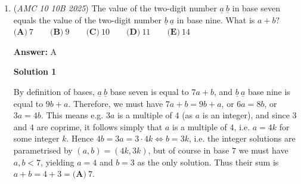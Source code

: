 \begin{enumerate}
 First:

 \( 2^9 = 512 \).

 But we do:

 \( 2^1 \equiv 2 \pmod{10},  2^2 \equiv 4,  2^3 \equiv 8,  2^4 \equiv 6,  2^5 \equiv 2, \), giving a cycle of length $4$.

 Since \( 9 \equiv 1 \pmod{4} \),

 \( 2^9 \equiv 2^1 \equiv 2 \pmod{10} \).

 This tells us nothing, but we keep it.

 Now compute the sums:

 
 \[\sum_{k=1}^{9} \binom{9}{k} = 2^9 - 1 = 511, \text{ and hence also } \sum_{k=1}^{9} \binom{9}{k-1} = 511.\]

 Substitute everything:

 
 \[P_{11}(1) = 10 + 10 \cdot 511 + 511 + 1.\]

 Compute in pieces:

 \( 10 \cdot 511 = 5110 \).

 Then

 \( 10 + 5110 = 5120, 5120 + 511 = 5631, 5631 + 1 = 5632 \).

 So the sum of the entries in the $11$th row is:

 
 \[5632.\]

 We need the sum of its digits:

 \( 5 + 6 + 3 + 2 = 16 \).

 Answer:

 
 \[\boxed{\textbf{(D) } 16}.\]



	\item (\textit{AMC 10 10B 2025}) The value of the two-digit number $\underline{a}~\underline{b}$ in base seven equals the value of the two-digit number $\underline{b}~\underline{a}$ in base nine. What is $a+b?$
$\textbf{(A)}~7\qquad\textbf{(B)}~9\qquad\textbf{(C)}~10\qquad\textbf{(D)}~11\qquad\textbf{(E)}~14$

 \textbf{Answer: }A



\textbf{Solution 1}

By definition of bases, $\underline{a}~\underline{b}$ base seven is equal to $7a+b$, and $\underline{b}~\underline{a}$ base nine is equal to $9b+a$. Therefore, we must have $7a+b=9b+a$, or $6a=8b$, or $3a=4b$. This means e.g. $3a$ is a multiple of $4$ (as $a$ is an integer), and since $3$ and $4$ are coprime, it follows simply that $a$ is a multiple of $4$, i.e. $a = 4k$ for some integer $k$. Hence $4b = 3a = 3 \cdot 4k \iff b = 3k$, i.e. the integer solutions are parametrised by $(a,b) = (4k,3k)$, but of course in base $7$ we must have $a,b < 7$, yielding $a=4$ and $b=3$ as the only solution. Thus their sum is $a+b = 4+3 = \boxed{\textbf{(A)}~7}$.


\end{enumerate}
